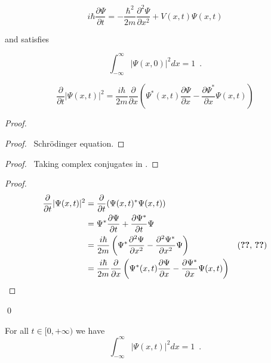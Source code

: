 \[ i \hbar \frac{\partial \Psi}{\partial t} = - \frac{\hbar^2}{2 m} \frac{\partial^2 \Psi}{\partial x^2} + V(x,t) \Psi(x,t) \]

and satisfies

\[ \int_{- \infty}^\infty |\Psi(x,0)|^2 dx = 1 \enspace . \]

\begin{prop}
\label{prop:differentiate_psi_squared}
\[ \frac{\partial}{\partial t} |\Psi(x,t)|^2 = \frac{i \hbar}{2m} \frac{\partial}{\partial x} \left(
\Psi^*(x,t) \frac{\partial \Psi}{\partial x} - \frac{\partial \Psi^*}{\partial x} \Psi(x,t) \right) \]
\end{prop}

\begin{proof}
\pf
{}
\begin{proof}
	\pf\ Schr\"{o}dinger equation.
\end{proof}
\begin{proof}
	\pf\ Taking complex conjugates in .
\end{proof}
\begin{proof}
	\pf
	\begin{align*}
		\frac{\partial}{\partial t} |\Psi(x,t)|^2
		& = \frac{\partial}{\partial t} (\Psi(x,t)^* \Psi(x,t)) \\
		& = \Psi^* \frac{\partial \Psi}{\partial t} + \frac{\partial \Psi^*}{\partial t} \Psi \\
		& = \frac{i \hbar}{2m} \left( \Psi^* \frac{\partial^2 \Psi}{\partial x^2} - \frac{\partial^2 \Psi^*}{\partial x^2} \Psi \right) & (\text{\stepref{1}, \stepref{2}}) \\
		& = \frac{i \hbar}{2m} \frac{\partial}{\partial x} \left(
\Psi^*(x,t) \frac{\partial \Psi}{\partial x} - \frac{\partial \Psi^*}{\partial x} \Psi(x,t) \right)
	\end{align*}
\end{proof}
\qed
\end{proof}

\begin{prop}
For all $t \in [0, + \infty)$ we have
\[ \int_{- \infty}^\infty |\Psi(x,t)|^2 dx = 1 \enspace . \]
\end{prop}

